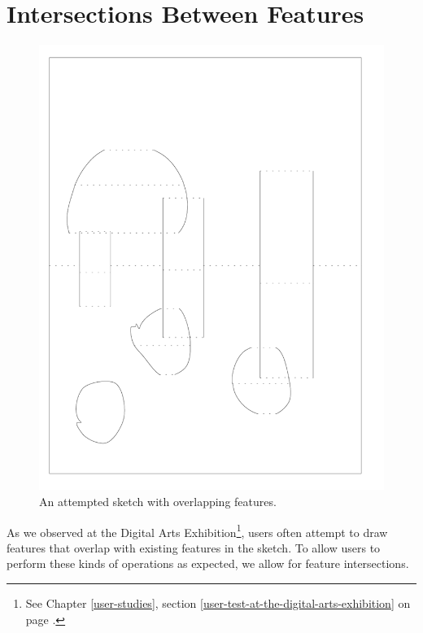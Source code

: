 \section{Intersections Between
Features}\label{intersections-between-features}

\begin{figure}[htbp]
\centering
\includegraphics{figures/91_Appendix_DAX_Creations/overlapping_features.png}
\caption{An attempted sketch with overlapping features.}
\end{figure}

As we observed at the Digital Arts Exhibition\footnote{See Chapter
  \ref{user-studies}, section
  \ref{user-test-at-the-digital-arts-exhibition} on page
  \pageref{user-test-at-the-digital-arts-exhibition}.}, users often
attempt to draw features that overlap with existing features in the
sketch. To allow users to perform these kinds of operations as expected,
we allow for feature intersections.

